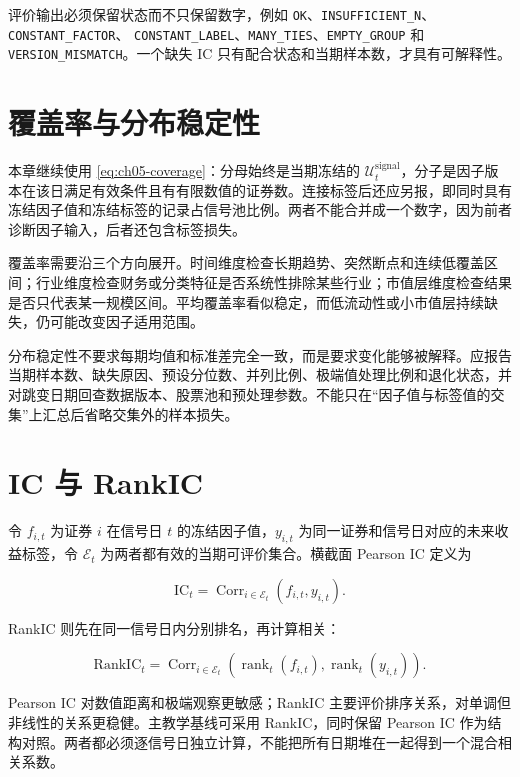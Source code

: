 评价输出必须保留状态而不只保留数字，例如
\texttt{OK}、\texttt{INSUFFICIENT\_N}、\texttt{CONSTANT\_FACTOR}、
\texttt{CONSTANT\_LABEL}、\texttt{MANY\_TIES}、\texttt{EMPTY\_GROUP} 和
\texttt{VERSION\_MISMATCH}。一个缺失 IC 只有配合状态和当期样本数，才具有可解释性。

\section{覆盖率与分布稳定性}

本章继续使用 \cref{eq:ch05-coverage}：分母始终是当期冻结的
\(\mathcal{U}^{\mathrm{signal}}_t\)，分子是因子版本在该日满足有效条件且有有限数值的证券数。连接标签后还应另报，即同时具有冻结因子值和冻结标签的记录占信号池比例。两者不能合并成一个数字，因为前者诊断因子输入，后者还包含标签损失。

覆盖率需要沿三个方向展开。时间维度检查长期趋势、突然断点和连续低覆盖区间；行业维度检查财务或分类特征是否系统性排除某些行业；市值层维度检查结果是否只代表某一规模区间。平均覆盖率看似稳定，而低流动性或小市值层持续缺失，仍可能改变因子适用范围。

分布稳定性不要求每期均值和标准差完全一致，而是要求变化能够被解释。应报告当期样本数、缺失原因、预设分位数、并列比例、极端值处理比例和退化状态，并对跳变日期回查数据版本、股票池和预处理参数。不能只在“因子值与标签值的交集”上汇总后省略交集外的样本损失。

\section{IC 与 RankIC}

令 \(f_{i,t}\) 为证券 \(i\) 在信号日 \(t\) 的冻结因子值，\(y_{i,t}\) 为同一证券和信号日对应的未来收益标签，令 \(\mathcal{E}_t\) 为两者都有效的当期可评价集合。横截面 Pearson IC 定义为

\begin{equation}
  \mathrm{IC}_t
  =
  \operatorname{Corr}_{i\in\mathcal{E}_t}
  \left(f_{i,t},y_{i,t}\right).
  \label{eq:ch06-ic}
\end{equation}

RankIC 则先在同一信号日内分别排名，再计算相关：

\begin{equation}
  \mathrm{RankIC}_t
  =
  \operatorname{Corr}_{i\in\mathcal{E}_t}
  \left(\operatorname{rank}_t(f_{i,t}),
  \operatorname{rank}_t(y_{i,t})\right).
  \label{eq:ch06-rankic}
\end{equation}

Pearson IC 对数值距离和极端观察更敏感；RankIC 主要评价排序关系，对单调但非线性的关系更稳健。主教学基线可采用 RankIC，同时保留 Pearson IC 作为结构对照。两者都必须逐信号日独立计算，不能把所有日期堆在一起得到一个混合相关系数。

